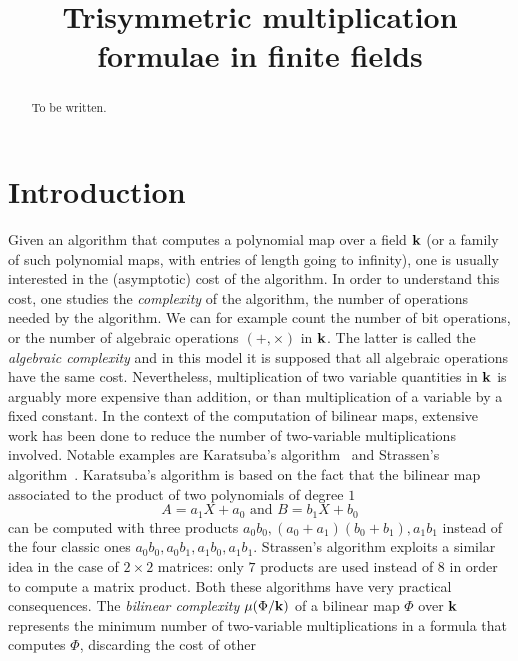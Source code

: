 \documentclass[11pt]{article}
\title{Trisymmetric multiplication formulae in finite fields}
\author{}
\begin{document}
\maketitle

\begin{abstract}
  To be written.
\end{abstract}


\section{Introduction}
\label{sec:intro}

Given an algorithm that computes a polynomial map over a field $\mathbf{k}$
(or a family of such polynomial maps, with entries of length going to infinity),
one is
usually interested in the (asymptotic) cost of the algorithm. In order to
understand this cost, one studies the \emph{complexity} of the algorithm, \ie
the number of operations needed by the algorithm. We can for example count the number
of bit operations, or the number of algebraic operations $(+, \times)$ in $\mathbf{k}$. The latter is called the \emph{algebraic complexity}
and in this model it is supposed that all algebraic operations have the same cost.
Nevertheless, multiplication of two variable quantities in $\mathbf{k}$ is arguably more expensive than
addition, or than multiplication of a variable by a fixed constant. In the context of the computation of
bilinear maps, extensive work has been done to reduce the number of
two-variable multiplications involved. Notable examples are Karatsuba's
algorithm~\cite{Karatsuba63} and
Strassen's algorithm~\cite{Strassen69}. Karatsuba's algorithm is
based on the fact that the bilinear map associated to the product of two
polynomials of degree $1$
\[
  A = a_1 X + a_0\text{ and }B = b_1 X + b_0
\]
can be computed with three products $a_0b_0, (a_0+a_1)(b_0+b_1), a_1b_1$ instead
of the four classic ones $a_0b_0, a_0b_1, a_1b_0, a_1b_1$. Strassen's algorithm
exploits a similar idea in the case of $2\times2$ matrices: only $7$ products
are used instead of $8$ in order to compute a matrix product. Both these
algorithms have very practical consequences. The \emph{bilinear complexity}
$\mu(\Phi/\mathbf{k})$ of a bilinear map $\Phi$ over $\mathbf{k}$ represents the minimum number of two-variable
multiplications in a formula that computes $\Phi$, discarding the cost of other
\end{document}
